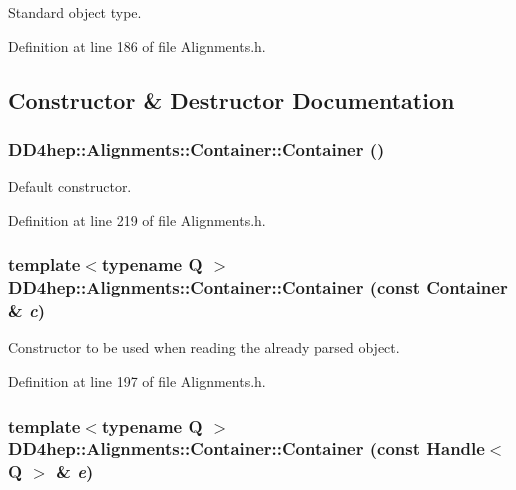Standard object type. 

Definition at line 186 of file Alignments.h.

\subsection{Constructor \& Destructor Documentation}
\hypertarget{class_d_d4hep_1_1_alignments_1_1_container_a17cf12ead74ea2c6359818a3b54668af}{
\subsubsection[{Container}]{\setlength{\rightskip}{0pt plus 5cm}DD4hep::Alignments::Container::Container ()}}
\label{class_d_d4hep_1_1_alignments_1_1_container_a17cf12ead74ea2c6359818a3b54668af}


Default constructor. 

Definition at line 219 of file Alignments.h.\hypertarget{class_d_d4hep_1_1_alignments_1_1_container_a28afaf22b27288ea423e7cbc79027eef}{
\subsubsection[{Container}]{\setlength{\rightskip}{0pt plus 5cm}template$<$typename Q $>$ DD4hep::Alignments::Container::Container (const {\bf Container} \& {\em c})}}
\label{class_d_d4hep_1_1_alignments_1_1_container_a28afaf22b27288ea423e7cbc79027eef}


Constructor to be used when reading the already parsed object. 

Definition at line 197 of file Alignments.h.\hypertarget{class_d_d4hep_1_1_alignments_1_1_container_a91f8253c2ad3e6c2d82b46a40d762b82}{
\subsubsection[{Container}]{\setlength{\rightskip}{0pt plus 5cm}template$<$typename Q $>$ DD4hep::Alignments::Container::Container (const {\bf Handle}$<$ Q $>$ \& {\em e})}}
\label{class_d_d4hep_1_1_alignments_1_1_container_a91f8253c2ad3e6c2d82b46a40d762b82}


